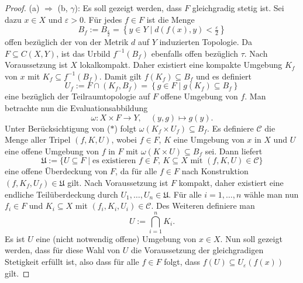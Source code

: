 \begin{proof}
  (a) $\Rightarrow$ (b, $\gamma$):
  Es soll gezeigt werden, dass $F$ gleichgradig stetig ist.
  Sei dazu $x \in X$ und $\varepsilon > 0$.
  Für jedes $f \in F$ ist die Menge
  \begin{displaymath}
    B_f := B_{\frac{\varepsilon}{2}} = \left\{ y \in Y \mid d(f(x),y) < \tfrac{\varepsilon}{2}\right\} 
  \end{displaymath}
  offen bezüglich der von der Metrik $d$ auf $Y$ induzierten Topologie.
  Da $F \subseteq C(X,Y)$, ist das Urbild $f^{-1}(B_f)$ ebenfalls offen bezüglich $\tau$.
  Nach Voraussetzung ist $X$ lokalkompakt.
  Daher existiert eine kompakte Umgebung $K_f$ von $x$ mit $K_f \subseteq f^{-1}(B_f)$.
  Damit gilt $f(K_f) \subseteq B_f$ und es definiert
  \begin{displaymath}
    U_f := F \cap (K_f, B_f) = \left\{g \in F \mid g(K_f) \subseteq B_f \right\} \tag{$\ast$}
  \end{displaymath}
  eine bezüglich der Teilraumtopologie auf $F$ offene Umgebung von $f$.
  Man betrachte nun die Evaluationsabbildung 
  \begin{displaymath}
    \omega: X \times F \to Y, \quad (y,g) \mapsto g(y).
  \end{displaymath}
  Unter Berücksichtigung von ($\ast$) folgt $\omega(K_f \times U_f) \subseteq B_f$.
  Es definiere $\mathcal{C}$ die Menge aller Tripel $(f,K,U)$, wobei $f \in F$, $K$ eine Umgebung von $x$ in $X$ und $U$ eine offene Umgebung von $f$ in $F$ mit $\omega(K \times U) \subseteq B_f$ sei.
  Dann liefert
  \begin{displaymath}
    \mathfrak{U} := \{ U \subseteq F \mid \text{es existieren $f \in F$, $K \subseteq X$ mit $(f,K,U) \in \mathcal C$} \}
  \end{displaymath}
  eine offene Überdeckung von $F$, da für alle $f \in F$ nach Konstruktion $(f,K_f,U_f) \in \mathfrak{U}$ gilt.
  Nach Voraussetzung ist $F$ kompakt, daher existiert eine endliche Teilüberdeckung durch $U_1,\dots,U_n \in \mathfrak{U}$.
  Für alle $i = 1,\dots,n$ wähle man nun $f_i \in F$ und $K_i \subseteq X$ mit $(f_i, K_i, U_i) \in \mathcal{C}$.
  Des Weiteren definiere man 
  \begin{displaymath}
    U := \bigcap_{i = 1}^n K_i.
  \end{displaymath}
  Es ist $U$ eine (nicht notwendig offene) Umgebung von $x \in X$.
  Nun soll gezeigt werden, dass für diese Wahl von $U$ die Voraussetzung der gleichgradigen Stetigkeit erfüllt ist, also dass für alle $f \in F$ folgt, dass $f(U) \subseteq U_\varepsilon(f(x))$ gilt.

\end{proof}
